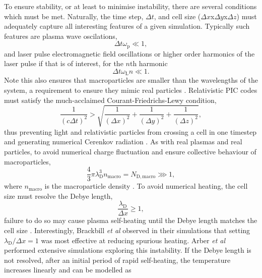 To ensure stability, or at least to minimise instability, there are several conditions which must be met. Naturally, the time step, $\Delta t$, and cell size ($\Delta x$x$\Delta y$x$\Delta z$) must adequately capture all interesting features of a given simulation. Typically such features are plasma wave oscilations,
\begin{equation}
	\Delta t \omega_\mathrm{p} \ll 1,
\end{equation} 
and laser pulse electromagnetic field oscillations or higher order harmonics of the laser pulse if that is of interest, for the $n$th harmonic
\begin{equation}
	\Delta t\omega_\mathrm{L}n \ll 1.
\end{equation} 
Note this also ensures that macroparticles are smaller than the wavelengths of the system, a requirement to ensure they mimic real particles \cite{okudaCollisionsPlasmaFiniteSize1970}. Relativistic PIC codes must satisfy the much-acclaimed \cite{demouraCourantFriedrichsLewy2013} Courant-Friedrichs-Lewy condition,
\begin{equation}
	\frac{1}{(c\Delta t)^2} > \sqrt{\frac{1}{(\Delta x)^2}+\frac{1}{(\Delta y)^2}+\frac{1}{(\Delta z)^2}},
\end{equation}
thus preventing light and relativistic particles from crossing a cell in one timestep and generating numerical Cerenkov radiation \cite{birdsall2004plasma}. As with real plasmas and real particles, to avoid numerical charge fluctuation and ensure collective behaviour of macroparticles,
\begin{equation}
	\frac{4}{3}\pi\lambda_\mathrm{D}^3n_\mathrm{macro} = N_\mathrm{D,macro} \ggg 1,
\end{equation}
where $n_\mathrm{macro}$ is the macroparticle density \cite{birdsall2004plasma}. To avoid numerical heating, the cell size must resolve the Debye length,
\begin{equation}
	\frac{\lambda_\mathrm{D}}{\Delta x} \ge 1,
\end{equation}
failure to do so may cause plasma self-heating until the Debye length matches the cell size \cite{birdsall2004plasma}. Interestingly, Brackbill \textit{et al} \cite{brackbillEnergyMomentumConservation2016} observed in their simulations that setting $\lambda_\mathrm{D}/\Delta x =1$ was most effective at reducing spurious heating. Arber \textit{et al} \cite{arberContemporaryParticleincellApproach2015} performed extensive simulations exploring this instability. If the Debye length is not resolved, after an initial period of rapid self-heating, the temperature increases linearly and can be modelled as
